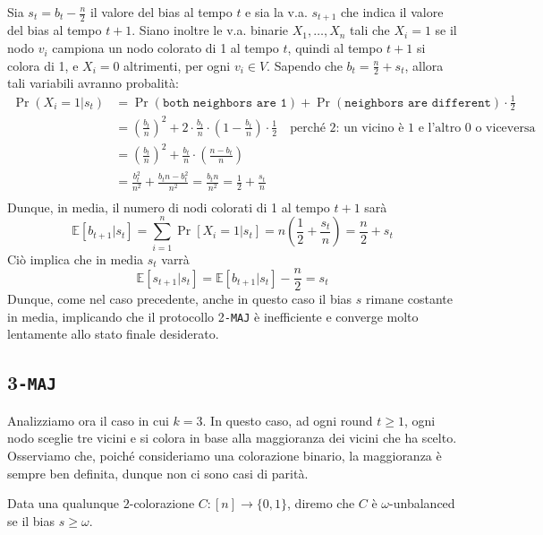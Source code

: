 Sia $s_t = b_t - \frac{n}{2}$ il valore del bias al tempo $t$ e sia la v.a. $s_{t+1}$ che indica il valore del bias al tempo $t+1$. Siano inoltre le v.a. binarie $X_1, \dots, X_n$ tali che $X_i = 1$ se il nodo $v_i$ campiona un nodo colorato di 1 al tempo $t$, quindi al tempo $t+1$ si colora di 1, e $X_i = 0$ altrimenti, per ogni $v_i \in V$. Sapendo che $b_t = \frac{n}{2} + s_t$, allora tali variabili avranno probalità:
\begin{align*}
    \Pr(X_i = 1 | s_t) 
    &= \Pr(\texttt{both neighbors are 1}) + \Pr(\texttt{neighbors are different}) \cdot \frac{1}{2} \\
    &= \left( \frac{b_t}{n} \right)^2 + 2 \cdot \frac{b_t}{n} \cdot \left(1 - \frac{b_t}{n}\right) \cdot \frac{1}{2} \quad \text{perché 2: un vicino è 1 e l'altro 0 o viceversa}\\
    &= \left( \frac{b_t}{n} \right)^2 + \frac{b_t}{n} \cdot \left(\frac{n - b_t}{n}\right) \\
    &= \frac{b_t^2}{n^2} + \frac{b_tn - b_t^2}{n^2} = \frac{b_tn}{n^2} = \frac{1}{2} + \frac{s_t}{n} \\
\end{align*}
Dunque, in media, il numero di nodi colorati di 1 al tempo $t+1$ sarà
\[
    \mathbb{E}[b_{t+1} | s_t] = \sum_{i=1}^n \Pr[X_i = 1| s_t] = n\left( \frac{1}{2} + \frac{s_t}{n} \right) = \frac{n}{2} + s_t
\]
Ciò implica che in media $s_t$ varrà
\[
    \mathbb{E}[s_{t+1} | s_t] = \mathbb{E}[b_{t+1} | s_t] - \frac{n}{2} = s_t
\]
Dunque, come nel caso precedente, anche in questo caso il bias $s$ rimane costante in media, implicando che il protocollo 2\texttt{-MAJ} è inefficiente e converge molto lentamente allo stato finale desiderato.

\subsection{3\texttt{-MAJ}}

Analizziamo ora il caso in cui $k = 3$. In questo caso, ad ogni round $t \geq 1$, ogni nodo sceglie tre vicini e si colora in base alla maggioranza dei vicini che ha scelto. Osserviamo che, poiché consideriamo una colorazione binario, la maggioranza è sempre ben definita, dunque non ci sono casi di parità.

\begin{definizione}
    Data una qualunque $2$-colorazione $C: [n] \to \{0,1\}$, diremo che $C$ è $\omega$-unbalanced se il bias $s \geq \omega$.
\end{definizione}

